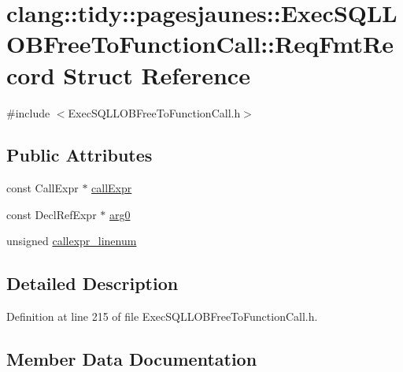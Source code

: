 \hypertarget{structclang_1_1tidy_1_1pagesjaunes_1_1_exec_s_q_l_l_o_b_free_to_function_call_1_1_req_fmt_record}{}\section{clang\+:\+:tidy\+:\+:pagesjaunes\+:\+:Exec\+S\+Q\+L\+L\+O\+B\+Free\+To\+Function\+Call\+:\+:Req\+Fmt\+Record Struct Reference}
\label{structclang_1_1tidy_1_1pagesjaunes_1_1_exec_s_q_l_l_o_b_free_to_function_call_1_1_req_fmt_record}


{\ttfamily \#include $<$Exec\+S\+Q\+L\+L\+O\+B\+Free\+To\+Function\+Call.\+h$>$}

\subsection*{Public Attributes}
\begin{DoxyCompactItemize}
\item 
const Call\+Expr $\ast$ \hyperlink{structclang_1_1tidy_1_1pagesjaunes_1_1_exec_s_q_l_l_o_b_free_to_function_call_1_1_req_fmt_record_a0a97beb7d13ecab537f2580d319e4eb8}{call\+Expr}
\item 
const Decl\+Ref\+Expr $\ast$ \hyperlink{structclang_1_1tidy_1_1pagesjaunes_1_1_exec_s_q_l_l_o_b_free_to_function_call_1_1_req_fmt_record_a6a7dc30cdb7753041e1fb41b8aeffefb}{arg0}
\item 
unsigned \hyperlink{structclang_1_1tidy_1_1pagesjaunes_1_1_exec_s_q_l_l_o_b_free_to_function_call_1_1_req_fmt_record_aba7e22fdb48a1e8f3db25957cfe83093}{callexpr\+\_\+linenum}
\end{DoxyCompactItemize}


\subsection{Detailed Description}


Definition at line 215 of file Exec\+S\+Q\+L\+L\+O\+B\+Free\+To\+Function\+Call.\+h.



\subsection{Member Data Documentation}
\mbox{\label{structclang_1_1tidy_1_1pagesjaunes_1_1_exec_s_q_l_l_o_b_free_to_function_call_1_1_req_fmt_record_a6a7dc30cdb7753041e1fb41b8aeffefb}} 
